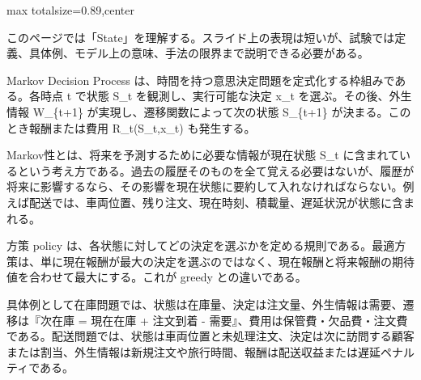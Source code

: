 \begin{minipage}[t]{0.58\textwidth}
\begin{adjustbox}{max totalsize={\textwidth}{0.89\textheight},center}
\begin{minipage}{\textwidth}\scriptsize
{}このページでは「State」を理解する。スライド上の表現は短いが、試験では定義、具体例、モデル上の意味、手法の限界まで説明できる必要がある。\par
Markov Decision Process は、時間を持つ意思決定問題を定式化する枠組みである。各時点 t で状態 S\_t を観測し、実行可能な決定 x\_t を選ぶ。その後、外生情報 W\_\{t+1\} が実現し、遷移関数によって次の状態 S\_\{t+1\} が決まる。このとき報酬または費用 R\_t(S\_t,x\_t) も発生する。\par
Markov性とは、将来を予測するために必要な情報が現在状態 S\_t に含まれているという考え方である。過去の履歴そのものを全て覚える必要はないが、履歴が将来に影響するなら、その影響を現在状態に要約して入れなければならない。例えば配送では、車両位置、残り注文、現在時刻、積載量、遅延状況が状態に含まれる。\par
方策 policy は、各状態に対してどの決定を選ぶかを定める規則である。最適方策は、単に現在報酬が最大の決定を選ぶのではなく、現在報酬と将来報酬の期待値を合わせて最大にする。これが greedy との違いである。\par
具体例として在庫問題では、状態は在庫量、決定は注文量、外生情報は需要、遷移は『次在庫 = 現在在庫 + 注文到着 - 需要』、費用は保管費・欠品費・注文費である。配送問題では、状態は車両位置と未処理注文、決定は次に訪問する顧客または割当、外生情報は新規注文や旅行時間、報酬は配送収益または遅延ペナルティである。\par

\end{minipage}
\end{adjustbox}
\end{minipage}
